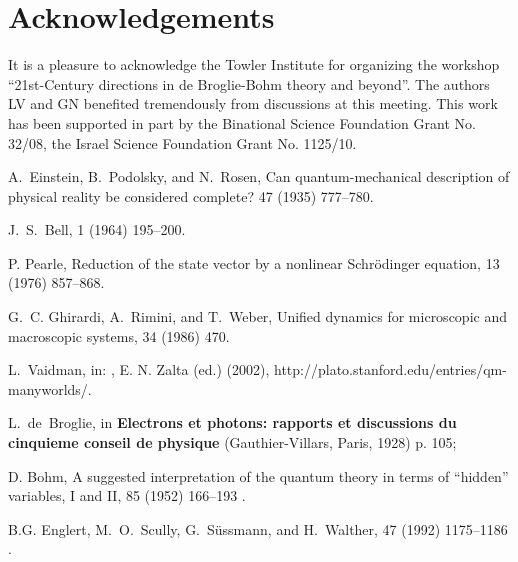 \documentclass[12pt,preprint,tightenlines]{elsarticle}
\begin{document}
\section*{Acknowledgements}

It is a pleasure to acknowledge the Towler Institute for organizing
the workshop  ``21st-Century directions in de Broglie-Bohm theory
and beyond''. The authors LV and GN benefited tremendously from discussions
at this meeting. This work has been supported in part by the Binational
Science Foundation Grant No. 32/08, the Israel Science Foundation
Grant No. 1125/10.

\begin{thebibliography}{40}

A.~Einstein, B.~Podolsky, and N.~Rosen,
\newblock Can quantum-mechanical description of physical reality be considered
  complete?
  47 (1935) 777--780.

J.~S.~Bell,
  1 (1964) 195--200.

P. Pearle,
\newblock Reduction of the state vector by a nonlinear Schr\"odinger equation,
   13 (1976) 857--868.

G.~C. Ghirardi, A.~Rimini, and T.~Weber,
\newblock Unified dynamics for microscopic and macroscopic systems,
  34 (1986) 470.

L.~Vaidman,
 in:
, E. N. Zalta (ed.) (2002),  http://plato.stanford.edu/entries/qm-manyworlds/.

L.~de~Broglie,
\newblock in {\bf Electrons et photons: rapports et discussions du cinquieme conseil de physique} (Gauthier-Villars,
Paris, 1928) p. 105;

D. Bohm,
\newblock A suggested interpretation of the quantum theory in terms of ``hidden''
  variables, I and II,
  85 (1952) 166--193 .

B.G. Englert, M.~O.~Scully, G.~S\"{u}ssmann, and H.~Walther,
  47 (1992) 1175--1186 .



\end{thebibliography}
\end{document}
